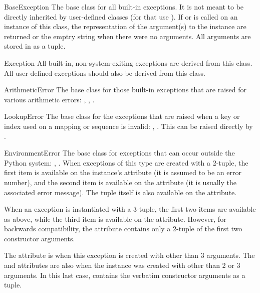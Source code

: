 \begin{excdesc}{BaseException}
The base class for all built-in exceptions.  It is not meant to be directly
inherited by user-defined classes (for that use ).  If
 or  is called on an instance of this
class, the representation of the argument(s) to the instance are returned or
the emptry string when there were no arguments.  All arguments are 
stored in  as a tuple.
\end{excdesc}

\begin{excdesc}{Exception}
All built-in, non-system-exiting exceptions are derived
from this class.  All user-defined exceptions should also be derived
from this class.
\end{excdesc}

\begin{excdesc}{ArithmeticError}
The base class for those built-in exceptions that are raised for
various arithmetic errors: ,
, .
\end{excdesc}

\begin{excdesc}{LookupError}
The base class for the exceptions that are raised when a key or
index used on a mapping or sequence is invalid: ,
.  This can be raised directly by
.
\end{excdesc}

\begin{excdesc}{EnvironmentError}
The base class for exceptions that
can occur outside the Python system: ,
.  When exceptions of this type are created with a
2-tuple, the first item is available on the instance's 
attribute (it is assumed to be an error number), and the second item
is available on the  attribute (it is usually the
associated error message).  The tuple itself is also available on the
 attribute.

When an  exception is instantiated with a
3-tuple, the first two items are available as above, while the third
item is available on the  attribute.  However, for
backwards compatibility, the  attribute contains only a
2-tuple of the first two constructor arguments.

The  attribute is  when this exception is
created with other than 3 arguments.  The  and
 attributes are also  when the instance was
created with other than 2 or 3 arguments.  In this last case,
 contains the verbatim constructor arguments as a tuple.
\end{excdesc}



